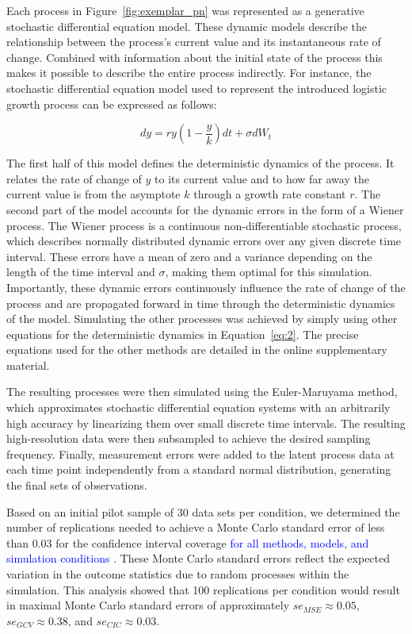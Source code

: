 \documentclass[man, floatsintext]{apa7}
\begin{document}
Each process in Figure~\ref{fig:exemplar_pn} was represented as a generative
stochastic differential equation model. These dynamic models describe the
relationship between the process's current value and its instantaneous rate of
change. Combined with information about the initial state of the process this
makes it possible to describe the entire process indirectly. For instance, the
stochastic differential equation model used to represent the introduced
logistic growth process can be expressed as follows:

\begin{equation} \label{eq:2}
  dy = r y (1-\frac{y}{k})dt + \sigma dW_t
\end{equation}

\noindent The first half of this model defines the deterministic dynamics of
the process. It relates the rate of change of $y$ to its current value and to
how far away the current value is from the asymptote $k$ through a growth rate
constant $r$. The second part of the model accounts for the dynamic errors in
the form of a Wiener process. The Wiener process is a continuous
non-differentiable stochastic process, which describes normally distributed
dynamic errors over any given discrete time interval. These errors have a mean
of zero and a variance depending on the length of the time interval and
$\sigma$, making them optimal for this simulation. Importantly, these dynamic
errors continuously influence the rate of change of the process and are
propagated forward in time through the deterministic dynamics of the model.
Simulating the other processes was achieved by simply using other equations for
the deterministic dynamics in Equation~\ref{eq:2}. The precise equations used
for the other methods are detailed in the online supplementary material.

The resulting processes were then simulated using the Euler-Maruyama method,
which approximates stochastic differential equation systems with an arbitrarily
high accuracy by linearizing them over small discrete time intervals. The
resulting high-resolution data were then subsampled to achieve the desired
sampling frequency. Finally, measurement errors were added to the latent
process data at each time point independently from a standard normal
distribution, generating the final sets of observations.

Based on an initial pilot sample of 30 data sets per condition, we determined
the number of replications needed to achieve a Monte Carlo standard error of
less than 0.03 for the confidence interval coverage \textcolor{blue}{for all
  methods, models, and simulation conditions}
\parencite{siepe_simulation_2023}. These Monte Carlo standard errors reflect
the expected variation in the outcome statistics due to random processes within
the simulation. This analysis showed that 100 replications per condition
would result in maximal Monte Carlo standard errors of approximately $se_{MSE}
  \approx 0.05$, $se_{GCV} \approx 0.38$, and $se_{CIC} \approx 0.03$.
\end{document}

